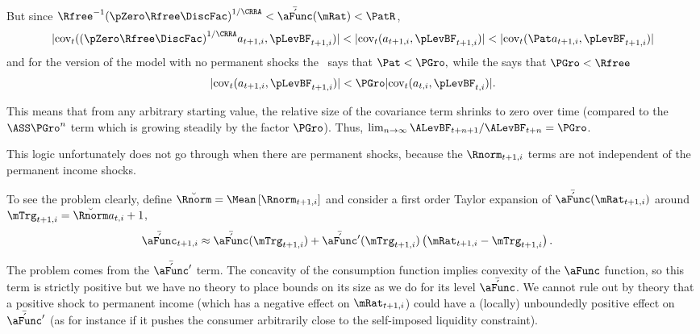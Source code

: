 \documentclass[\econtexRoot/BufferStockTheory]{subfiles}
\begin{document}
But since ${\Rfree}^{-1}{(\pZero  \Rfree\DiscFac)}^{1/\CRRA} < \AMPS(\mRat) < \PatR $,
\begin{equation}
  |\mbox{cov}_{t}({(\pZero  \Rfree\DiscFac)}^{1/\CRRA}a_{t+1,i},\pLevBF_{t+1,i})| <
  |\mbox{cov}_{t}(a_{t+1,i},\pLevBF_{t+1,i})| <
  |\mbox{cov}_{t}({\Pat}a_{t+1,i},\pLevBF_{t+1,i})| \nonumber
\end{equation}
and for the version of the model with no permanent shocks the \GICNrm~says that
${\Pat} < \PGro, $ while the {\FHWC} says that $\PGro < \Rfree$
\begin{equation}\begin{gathered}\begin{aligned}
  |\mbox{cov}_{t}(a_{t+1,i},\pLevBF_{t+1,i})| < \PGro
  |\mbox{cov}_{t}(a_{t,i},\pLevBF_{t,i})|. \nonumber
\end{aligned}\end{gathered}\end{equation}


This means that from any arbitrary starting value, the relative
size of the covariance term shrinks to zero over time (compared
to the $\ASS \PGro^{n}$ term which is growing steadily
by the factor $\PGro$).  Thus, $\lim_{n \rightarrow \infty} \ALevBF_{t+n+1}/\ALevBF_{t+n} = \PGro$.

This logic unfortunately does not go through when there are permanent
shocks, because the $\Rnorm _{t+1,i}$ terms are not independent
of the permanent income shocks.

To see the problem clearly, define $\breve{\Rnorm }=\Mean\left[\Rnorm _{t+1,i}\right]$ and consider a first order Taylor expansion of $\AMPS(\mRat_{t+1,i})$ around $\mTrg_{t+1,i}=\breve{\Rnorm } a_{t,i}+1$,
\begin{align*}
  \AMPS_{t+1,i} & \approx 
  \AMPS(\mTrg_{t+1,i})+\AMPS^{\prime}(\mTrg_{t+1,i})\left(\mRat_{t+1,i}-\mTrg_{t+1,i}\right)
 \nonumber.
\end{align*}


The problem comes from the $\AMPS^{\prime}$ term.  The
concavity of the consumption function implies convexity of the
$\aFunc$ function, so this term is strictly positive but we have no
theory to place bounds on its size as we do for its level $\AMPS$.
We cannot rule out by theory that a positive shock to permanent income (which has a
negative effect on $\mRat_{t+1,i}$) could have a (locally) unboundedly positive
effect on $\AMPS^{\prime}$ (as for instance if it pushes the
consumer arbitrarily close to the self-imposed liquidity constraint).
\end{document}
